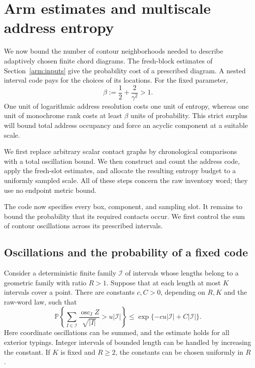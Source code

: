 \section{Arm estimates and multiscale address entropy}
\label{arm:section}

We now bound the number of contour neighborhoods needed to describe
adaptively chosen finite chord diagrams.  The fresh-block estimates of
Section~\ref{arm:inputs} give the probability cost of a prescribed
diagram.  A nested interval code pays for the choices of its locations.
For the fixed parameter,
\[
 \beta:=\frac12+\frac2{\gamma^2}>1.
\]
One unit of logarithmic address resolution costs one unit of entropy,
whereas one unit of monochrome rank costs at least $\beta$ units of
probability.  This strict surplus will bound total address occupancy and
force an acyclic component at a suitable scale.

We first replace arbitrary scalar contact graphs by chronological
comparisons with a total oscillation bound.  We then construct and count
the address code, apply the fresh-slot estimates, and allocate the
resulting entropy budget to a uniformly sampled scale.  All of these
steps concern the raw inventory word; they use no endpoint metric bound.





The code now specifies every box, component, and sampling slot.  It remains
to bound the probability that its required contacts occur.  We first
control the sum of contour oscillations across its prescribed intervals.

\subsection{Oscillations and the probability of a fixed code}

\begin{lemma}
\label{arm:oscillation-sum}
Consider a deterministic finite family $\mathcal I$ of intervals whose
lengths belong to a geometric family with ratio $R>1$.  Suppose that
at each length at most $K$ intervals cover a point.  There are constants
$c,C>0$, depending on $R,K$ and the raw-word law, such that
\[
 \mathbb P\left\{
  \sum_{I\in\mathcal I}\frac{\operatorname{osc}_I Z}{\sqrt{|I|}}
       >u|\mathcal I|\right\}
 \le \exp\{-cu|\mathcal I|+C|\mathcal I|\}.
\]
Here coordinate oscillations can be summed, and the estimate holds for
all exterior typings.  Integer intervals of bounded length can be
handled by increasing the constant.  If $K$ is fixed and $R\ge2$, the
constants can be chosen uniformly in $R$.
\end{lemma}

